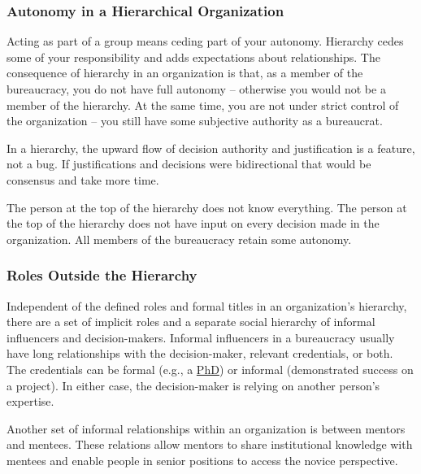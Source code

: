 \subsubsection*{Autonomy in a Hierarchical Organization}

Acting as part of a group means ceding part of your autonomy. Hierarchy cedes some of your responsibility and adds expectations about relationships.
The consequence of hierarchy in an organization is that, as a member of the bureaucracy, you do not have full autonomy -- otherwise you would not be a member of the hierarchy. At the same time, you are not under strict control of the organization -- you still have some subjective %
authority as a bureaucrat.

In a hierarchy, the upward flow of decision authority and justification is a feature, not a bug.
If justifications and decisions were bidirectional that would be consensus and take more time.

The person at the top of the hierarchy does not know everything. The person at the top of the hierarchy does not have input on every decision made in the organization. All members of the bureaucracy retain some autonomy.

\subsubsection*{Roles Outside the Hierarchy}

Independent of the defined roles and formal titles in an organization's hierarchy, there are a set of implicit roles and a separate social hierarchy of informal influencers and decision-makers. Informal influencers in a bureaucracy usually have long relationships with the decision-maker, relevant credentials, or both. The credentials can be formal (e.g., a \href{https://en.wikipedia.org/wiki/Doctor_of_Philosophy}{PhD}) 
\iftoggle{WPinmargin}{\marginpar{$>$Wikipedia: Doctor of Philosophy}}{}
or informal (demonstrated success on a project). In either case, the decision-maker is relying on another person's expertise. 

Another set of informal relationships within an organization is between mentors and mentees. These relations allow mentors to share institutional knowledge with mentees and enable people in senior positions to access the novice perspective. 


